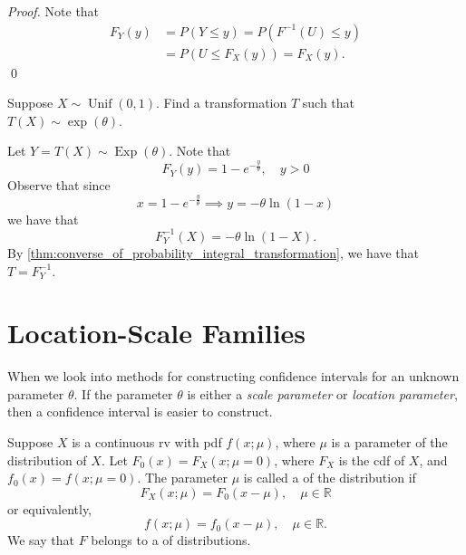 \documentclass[notoc,notitlepage]{tufte-book}
\DeclareMathOperator{\Exp}{Exp }
\DeclareMathOperator{\Unif}{Unif }
\begin{document}
\begin{proof}
  Note that
  \begin{align*}
    F_Y(y) &= P(Y \leq y) = P( F^{-1}(U) \leq y ) \\
           &= P(U \leq F_X(y)) = F_X(y).
  \end{align*}\qed
\end{proof}

\begin{eg}[Example 2.12]
  Suppose $X \sim \Unif(0, 1)$. Find a transformation $T$ such that $T(X) \sim \exp(\theta)$.

  \begin{solution}
    Let $Y = T(X) \sim \Exp(\theta)$. Note that
    \begin{equation*}
      F_Y(y) = 1 - e^{-\frac{y}{\theta}}, \quad y > 0
    \end{equation*}
    Observe that since
    \begin{equation*}
      x = 1 - e^{-\frac{y}{\theta}} \implies y = - \theta \ln (1 - x)
    \end{equation*}
    we have that
    \begin{equation*}
      F_Y^{-1}(X) = - \theta \ln (1 - X).
    \end{equation*}
    By \autoref{thm:converse_of_probability_integral_transformation}, we have that $T = F_Y^{-1}$.
  \end{solution}
\end{eg}


\section{Location-Scale Families}%
\label{sec:location_scale_families}

When we look into methods for constructing confidence intervals for an unknown parameter $\theta$. If the parameter $\theta$ is either a \textit{scale parameter} or \textit{location parameter}, then a confidence interval is easier to construct.

\begin{defn}
\label{defn:location_parameter_and_family}
  Suppose $X$ is a continuous rv with pdf $f(x; \mu)$, where $\mu$ is a parameter of the distribution of $X$. Let $F_0(x) = F_X(x; \mu = 0)$, where $F_X$ is the cdf of $X$, and $f_0(x) = f(x; \mu = 0)$. The parameter $\mu$ is called a  of the distribution if
  \begin{equation*}
    F_X(x; \mu) = F_0( x - \mu ), \quad \mu \in \mathbb{R}
  \end{equation*}
  or equivalently,
  \begin{equation*}
    f(x; \mu) = f_0( x - \mu ), \quad \mu \in \mathbb{R}.
  \end{equation*}
  We say that $F$ belongs to a  of distributions.
\end{defn}
\end{document}
